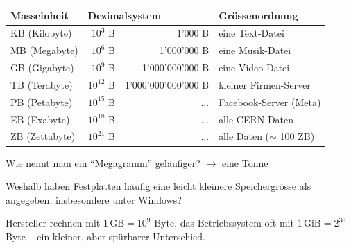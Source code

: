 \begin{frame}
\begin{table}[H]
	\footnotesize
	\centering
	\begin{tabular}{@{}l|rr|l@{}}
		\midrule
		\textbf{Masseinheit} & \multicolumn{2}{l|}{\textbf{Dezimalsystem}} & Grössenordnung                                   \\ \midrule
		KB (Kilobyte)        & $10^3$ B                               & 1'000 B             & eine Text-Datei            \\
		MB (Megabyte)        & $10^6$ B                                    & 1'000'000 B         & eine Musik-Datei           \\
		GB (Gigabyte)        & $10^9$ B                                    & 1'000'000'000 B     & eine Video-Datei           \\
		TB (Terabyte)        & $10^{12}$ B                                 & 1'000'000'000'000 B & kleiner Firmen-Server      \\
		PB (Petabyte)        & $10^{15}$ B                                 & ...                 & Facebook-Server (Meta)     \\
		EB (Exabyte)         & $10^{18}$ B                                 & ...                 & alle CERN-Daten            \\
		ZB (Zettabyte)       & $10^{21}$ B                                 & ...                 & alle Daten ($\sim$ 100 ZB) \\ \midrule
	\end{tabular}
\end{table}
\begin{center}
	Wie nennt man ein \enquote{Megagramm} geläufiger? $\rightarrow$ eine Tonne
\end{center}
\end{frame}

\begin{frame}
\begin{center}
Weshalb haben Festplatten häufig eine leicht kleinere Speichergrösse als angegeben, insbesondere unter Windows?
\end{center}
\begin{center}\small Hersteller rechnen mit $1\,\mathrm{GB}=10^9$ Byte, das Betriebssystem oft mit $1\,\mathrm{GiB}=2^{30}$ Byte -- ein kleiner, aber spürbarer Unterschied.\end{center}
\end{frame}